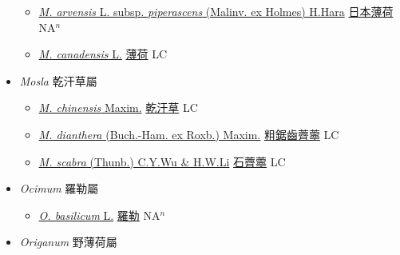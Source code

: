 \begin{itemize}
  \begin{itemize}
        \item[] \href{http://www.theplantlist.org/tpl1.1/search?q=Mentha+arvensis+subsp.+piperascens}{\textit{M. arvensis} L. subsp. \textit{piperascens} (Malinv. ex Holmes) H.Hara}   \href{\detokenize{http://taibnet.sinica.edu.tw/chi/taibnet_species_list.php?T2=日本薄荷&T2_new_value=true&fr=y}}{日本薄荷} NA$^n$
        \item[] \href{http://www.theplantlist.org/tpl1.1/search?q=Mentha+canadensis}{\textit{M. canadensis} L.}   \href{\detokenize{http://taibnet.sinica.edu.tw/chi/taibnet_species_list.php?T2=薄荷&T2_new_value=true&fr=y}}{薄荷} LC
  \end{itemize}
 \item[] \textit{Mosla} 乾汗草屬
                    
  \begin{itemize}
        \item[] \href{http://www.theplantlist.org/tpl1.1/search?q=Mosla+chinensis}{\textit{M. chinensis} Maxim.}   \href{\detokenize{http://taibnet.sinica.edu.tw/chi/taibnet_species_list.php?T2=乾汗草&T2_new_value=true&fr=y}}{乾汗草} LC
        \item[] \href{http://www.theplantlist.org/tpl1.1/search?q=Mosla+dianthera}{\textit{M. dianthera} (Buch.-Ham. ex Roxb.) Maxim.}   \href{\detokenize{http://taibnet.sinica.edu.tw/chi/taibnet_species_list.php?T2=粗鋸齒薺薴&T2_new_value=true&fr=y}}{粗鋸齒薺薴} LC
        \item[] \href{http://www.theplantlist.org/tpl1.1/search?q=Mosla+scabra}{\textit{M. scabra} (Thunb.) C.Y.Wu \& H.W.Li}   \href{\detokenize{http://taibnet.sinica.edu.tw/chi/taibnet_species_list.php?T2=石薺薴&T2_new_value=true&fr=y}}{石薺薴} LC
  \end{itemize}
 \item[] \textit{Ocimum} 羅勒屬
                    
  \begin{itemize}
        \item[] \href{http://www.theplantlist.org/tpl1.1/search?q=Ocimum+basilicum}{\textit{O. basilicum} L.}   \href{\detokenize{http://taibnet.sinica.edu.tw/chi/taibnet_species_list.php?T2=羅勒&T2_new_value=true&fr=y}}{羅勒} NA$^n$
  \end{itemize}
 \item[] \textit{Origanum} 野薄荷屬
                    

\end{itemize}
